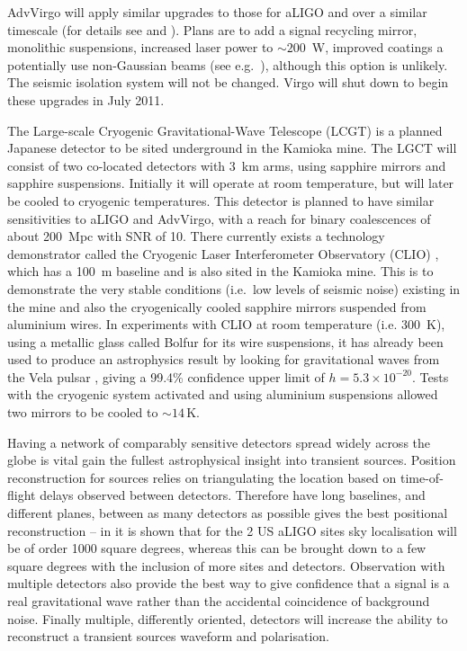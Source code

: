 \documentclass{article}
\begin{document}
AdvVirgo will apply similar upgrades to those for aLIGO and over a similar
timescale (for details see \cite{AdVwhitepaper} and \cite{AdVdesign}). Plans are
to add a signal recycling mirror, monolithic suspensions, increased laser power
to $\sim200$~W, improved coatings a potentially use non-Gaussian beams (see
e.g.~\cite{Freise:2010}), although this option is unlikely. The seismic isolation
system will not be changed. Virgo will shut down to begin these upgrades in July
2011.

The Large-scale Cryogenic Gravitational-Wave Telescope (LCGT)
\cite{Miyoki:2005, Ohashi:2008} is a planned Japanese detector to be sited
underground in the Kamioka mine. The LGCT will consist of two co-located
detectors with 3~km arms, using sapphire mirrors and sapphire suspensions.
Initially it will operate at room temperature, but will later be cooled to
cryogenic temperatures. This detector is planned to have similar sensitivities
to aLIGO and AdvVirgo, with a reach for binary coalescences of about 200~Mpc
with SNR of 10. There currently exists a technology demonstrator called the
Cryogenic Laser Interferometer Observatory (CLIO) \cite{Yamamoto:2008, CLIOweb},
which has a 100~m baseline and is also sited in the Kamioka mine. This is to
demonstrate the very stable conditions (i.e.\ low levels of seismic noise)
existing in the mine and also the cryogenically cooled sapphire mirrors
suspended from aluminium wires. In experiments with CLIO at room temperature
(i.e. 300~K), using a metallic glass called Bolfur for its wire suspensions, it
has already been used to produce an astrophysics result by looking for
gravitational waves from the Vela pulsar \cite{Akutsu:2008}, giving a 99.4\%
confidence upper limit of $h = 5.3\times10^{-20}$. Tests with the cryogenic
system activated and using aluminium suspensions allowed two mirrors to be
cooled to $\sim14$\,K.

Having a network of comparably sensitive detectors spread widely across the
globe is vital gain the fullest astrophysical insight into transient sources.
Position reconstruction for sources relies on triangulating the location based
on time-of-flight delays observed between detectors. Therefore have long
baselines, and different planes, between as many detectors as possible gives the
best positional reconstruction -- in \cite{Fairhurst:2010} it is shown that for
the 2 US aLIGO sites sky localisation will be of order 1000 square degrees,
whereas this can be brought down to a few square degrees with the inclusion of
more sites and detectors. Observation with multiple detectors also provide the
best way to give confidence that a signal is a real gravitational wave rather
than the accidental coincidence of background noise. Finally multiple,
differently oriented, detectors will increase the ability to reconstruct a
transient sources waveform and polarisation.
\end{document}
